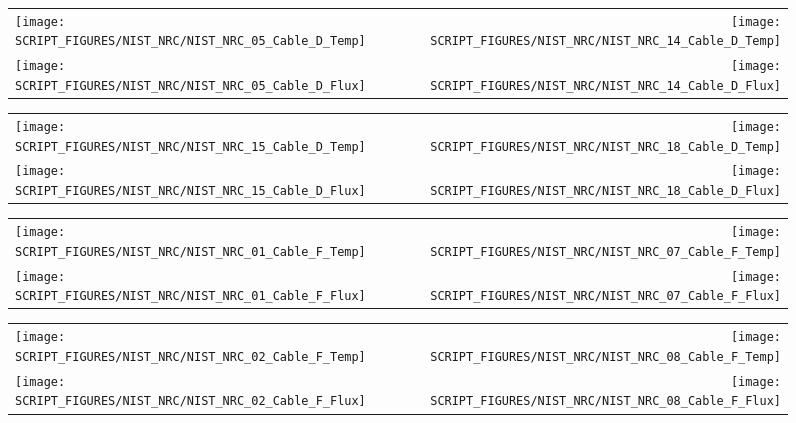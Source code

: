 \begin{figure}[!ht]
\begin{tabular*}{\textwidth}{l@{\extracolsep{\fill}}r}
\texttt{[image: SCRIPT\_FIGURES/NIST\_NRC/NIST\_NRC\_05\_Cable\_D\_Temp]} &
\texttt{[image: SCRIPT\_FIGURES/NIST\_NRC/NIST\_NRC\_14\_Cable\_D\_Temp]} \\
\texttt{[image: SCRIPT\_FIGURES/NIST\_NRC/NIST\_NRC\_05\_Cable\_D\_Flux]} &
\texttt{[image: SCRIPT\_FIGURES/NIST\_NRC/NIST\_NRC\_14\_Cable\_D\_Flux]}
\end{tabular*}
\label{NIST_NRC_D_5_and_14}
\end{figure}

\clearpage

\begin{figure}[!ht]
\begin{tabular*}{\textwidth}{l@{\extracolsep{\fill}}r}
\texttt{[image: SCRIPT\_FIGURES/NIST\_NRC/NIST\_NRC\_15\_Cable\_D\_Temp]} &
\texttt{[image: SCRIPT\_FIGURES/NIST\_NRC/NIST\_NRC\_18\_Cable\_D\_Temp]} \\
\texttt{[image: SCRIPT\_FIGURES/NIST\_NRC/NIST\_NRC\_15\_Cable\_D\_Flux]} &
\texttt{[image: SCRIPT\_FIGURES/NIST\_NRC/NIST\_NRC\_18\_Cable\_D\_Flux]}
\end{tabular*}
\label{NIST_NRC_D_15_and_18}
\end{figure}

\clearpage

\begin{figure}[!ht]
\begin{tabular*}{\textwidth}{l@{\extracolsep{\fill}}r}
\texttt{[image: SCRIPT\_FIGURES/NIST\_NRC/NIST\_NRC\_01\_Cable\_F\_Temp]} &
\texttt{[image: SCRIPT\_FIGURES/NIST\_NRC/NIST\_NRC\_07\_Cable\_F\_Temp]} \\
\texttt{[image: SCRIPT\_FIGURES/NIST\_NRC/NIST\_NRC\_01\_Cable\_F\_Flux]} &
\texttt{[image: SCRIPT\_FIGURES/NIST\_NRC/NIST\_NRC\_07\_Cable\_F\_Flux]}
\end{tabular*}
\label{NIST_NRC_F_1_and_7}
\end{figure}

\begin{figure}[!ht]
\begin{tabular*}{\textwidth}{l@{\extracolsep{\fill}}r}
\texttt{[image: SCRIPT\_FIGURES/NIST\_NRC/NIST\_NRC\_02\_Cable\_F\_Temp]} &
\texttt{[image: SCRIPT\_FIGURES/NIST\_NRC/NIST\_NRC\_08\_Cable\_F\_Temp]} \\
\texttt{[image: SCRIPT\_FIGURES/NIST\_NRC/NIST\_NRC\_02\_Cable\_F\_Flux]} &
\texttt{[image: SCRIPT\_FIGURES/NIST\_NRC/NIST\_NRC\_08\_Cable\_F\_Flux]}
\end{tabular*}
\label{NIST_NRC_F_2_and_8}
\end{figure}

